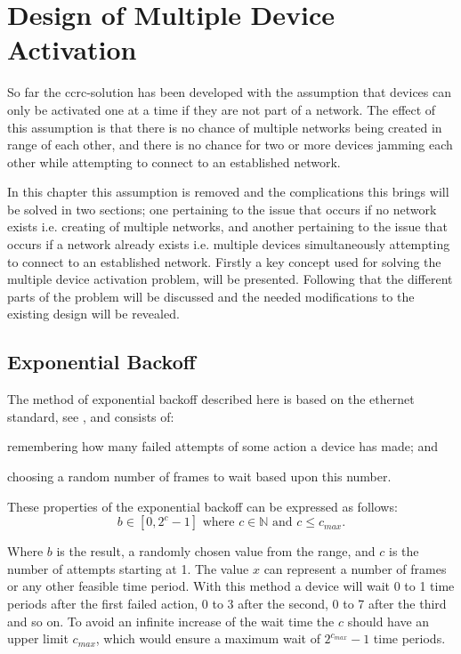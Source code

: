 \chapter{Design of Multiple Device Activation}\label{chap:MDA-CCRC}
So far the \gls{ccrc}-solution has been developed with the assumption that devices can only be activated one at a time if they are not part of a network.
The effect of this assumption is that there is no chance of multiple networks being created in range of each other, and there is no chance for two or more devices jamming each other while attempting to connect to an established network.

In this chapter this assumption is removed and the complications this brings will be solved in two sections; one pertaining to the issue that occurs if no network exists i.e. creating of multiple networks, and another pertaining to the issue that occurs if a network already exists i.e. multiple devices simultaneously attempting to connect to an established network.
Firstly a key concept used for solving the multiple device activation problem, will be presented.
Following that the different parts of the problem will be discussed and the needed modifications to the existing design will be revealed.

\section{Exponential Backoff} %
\label{sec:exponential_backoff}
The method of exponential backoff described here is based on the ethernet standard, see \citep{Ebackoff}, and consists of:
\begin{enumerate*}[label=\itshape \alph*\upshape)]
    \item remembering how many failed attempts of some action a device has made; and
    \item choosing a random number of frames to wait based upon this number.   
\end{enumerate*}
These properties of the exponential backoff can be expressed as follows:
\begin{equation}
     b \in [0, 2^c - 1] \text{ where } c \in \mathbb{N} \text{ and } {c \leq c_{max}}.
\end{equation}

\noindent
Where $b$ is the result, a randomly chosen value from the range, and $c$ is the number of attempts starting at 1. 
The value $x$ can represent a number of frames or any other feasible time period.
With this method a device will wait 0 to 1 time periods after the first failed action, 0 to 3 after the second, 0 to 7 after the third and so on. 
To avoid an infinite increase of the wait time the $c$ should have an upper limit $c_{max}$, which would ensure a maximum wait of $2^{c_{max}}-1$ time periods.

